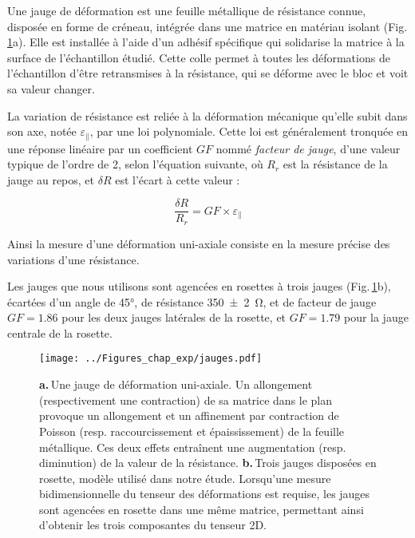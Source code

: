 
Une jauge de déformation est une feuille métallique de résistance connue, disposée en forme de créneau, intégrée dans une matrice en matériau isolant (Fig.\,\ref{fig:jauge}a). Elle est installée à l'aide d'un adhésif spécifique qui solidarise la matrice à la surface de l'échantillon étudié. Cette colle permet à toutes les déformations de l'échantillon d'être retransmises à la résistance, qui se déforme avec le bloc et voit sa valeur changer.

La variation de résistance est reliée à la déformation mécanique qu'elle subit dans son axe, notée $\varepsilon_{\parallel}$, par une loi polynomiale. Cette loi est généralement tronquée en une réponse linéaire par un coefficient $GF$ nommé \textit{facteur de jauge}, d'une valeur typique de l'ordre de 2, selon l'équation suivante, où $R_r$ est la résistance de la jauge au repos, et $\delta R$ est l'écart à cette valeur :

\begin{equation}
\label{eq:jauge}
\dfrac{\delta R}{R_r} = GF\times \varepsilon_{\parallel}
\end{equation}

Ainsi la mesure d'une déformation uni-axiale consiste en la mesure précise des variations d'une résistance.



Les jauges que nous utilisons sont agencées en rosettes à trois jauges (Fig.\,\ref{fig:jauge}b), écartées d'un angle de \ang{45}, de résistance \SI{350 +- 2}{\ohm}, et de facteur de jauge $GF=1.86$ pour les deux jauges latérales de la rosette, et $GF=1.79$ pour la jauge centrale de la rosette.



\begin{figure}[htb]
\centering	
\texttt{[image: ../Figures\_chap\_exp/jauges.pdf]}
\caption[Jauge de déformation]{\textbf{a.}\,Une jauge de déformation uni-axiale. Un allongement (respectivement une contraction) de sa matrice dans le plan provoque un allongement et un affinement par contraction de Poisson (resp. raccourcissement et épaississement) de la feuille métallique. Ces deux effets entraînent une augmentation (resp. diminution) de la valeur de la résistance. \textbf{b.}\,Trois jauges disposées en rosette, modèle utilisé dans notre étude. Lorsqu'une mesure bidimensionnelle du tenseur des déformations est requise, les jauges sont agencées en rosette dans une même matrice, permettant ainsi d'obtenir les trois composantes du tenseur 2D.}
\label{fig:jauge}
\end{figure}


